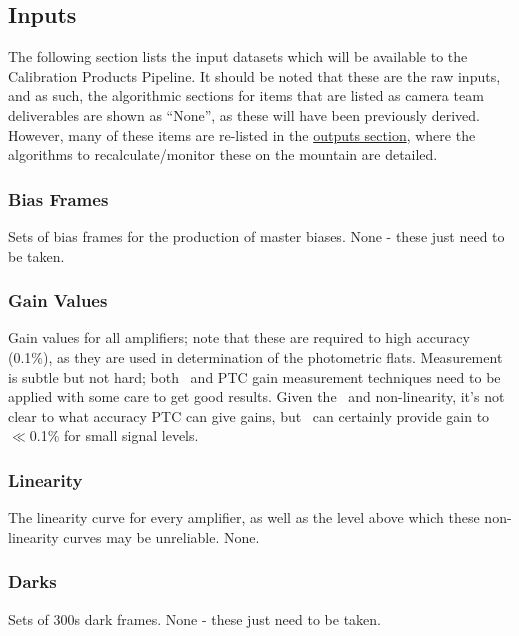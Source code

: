 
\subsection{Inputs}
\label{sec:CPP:inputs} 
The following section lists the input datasets which will be available to the Calibration Products Pipeline. It should be noted that these are the raw inputs, and as such, the algorithmic sections for items that are listed as camera team deliverables are shown as ``None'', as these will have been previously derived. However, many of these items are re-listed in the \hyperref[sec:CPP:output]{outputs section}, where the algorithms to recalculate/monitor these on the mountain are detailed.

\subsubsection{Bias Frames}\label{sec:CPP:inputs:biases} 
Sets of bias frames for the production of master biases.
\alg None - these just need to be taken.


\subsubsection{Gain Values}\label{sec:CPP:inputs:gain} 
\cameraTeam
Gain values for all amplifiers; note that these are required to high accuracy (0.1\%), as they are used in determination of the photometric flats.
\alg Measurement is subtle but not hard; both \fefiftyfive\ and PTC gain measurement techniques need to be applied with some care to get good results. Given the \bfeffect\ and non-linearity, it's not clear to what accuracy PTC can give gains, but \fefiftyfive\ can certainly provide gain to $\ll$0.1\% for small signal levels.


\subsubsection{Linearity}\label{sec:CPP:inputs:linearityCurve} 
\cameraTeam
The linearity curve for every amplifier, as well as the level above which these non-linearity curves may be unreliable.
\alg None.


\subsubsection{Darks}\label{sec:CPP:inputs:dark}
Sets of 300s dark frames.
\alg None - these just need to be taken.


